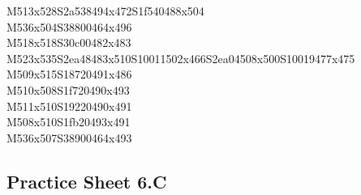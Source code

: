 \documentclass{article}
\begin{document}
\begin{multicols}{5}
\begin{center}
M513x528S2a538494x472S1f540488x504 %
\\M536x504S38800464x496 %
\\M518x518S30c00482x483 %
\\M523x535S2ea48483x510S10011502x466S2ea04508x500S10019477x475 %
\\M509x515S18720491x486 %
\\M510x508S1f720490x493 %
\\M511x510S19220490x491 %
\\M508x510S1fb20493x491 %
\\M536x507S38900464x493 %
\vfil

\end{center}
\end{multicols}

\subsection{Practice Sheet 6.C}
\end{document}
